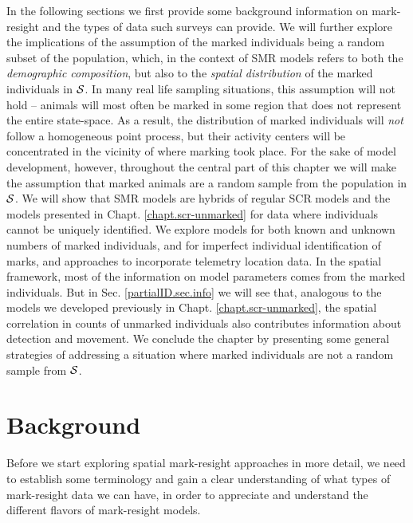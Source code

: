 In the following sections we first provide some background
information on mark-resight and the types of data such surveys can
provide. We will further explore the implications of the assumption of
the marked individuals being a random subset of the population, which,
in the context of SMR models refers to both the \emph{demographic
  composition}, but also to the \emph{spatial distribution} of the
marked individuals in ${\cal S}$. 
In many real life sampling situations, this assumption will not hold
-- animals will most often be marked in some region that does not
represent the entire state-space. As a result, the distribution of marked individuals will \emph{not} follow a homogeneous point process, but their activity centers will be concentrated in the vicinity of where marking took place. 
For the sake of model development, however, throughout the central part of this chapter we will make the assumption that marked animals are a random sample from the population in ${\cal S}$. We will show that SMR models are hybrids of regular SCR models and the models
presented in Chapt. \ref{chapt.scr-unmarked} for data where
individuals cannot be uniquely identified. We explore models for both
known and unknown numbers of marked individuals, and for imperfect
individual identification of marks, and approaches to incorporate
telemetry location data. In the spatial framework, most of the
information on model parameters comes from the marked individuals. But
in Sec. \ref{partialID.sec.info} we will see that, analogous to the
models we developed previously in Chapt. \ref{chapt.scr-unmarked}, the
spatial correlation in counts of unmarked individuals also contributes
information about detection and movement. 
We conclude the chapter by presenting some general strategies of addressing a situation where marked individuals are not a random sample from ${\cal S}$. 


\section{Background}

Before we start exploring spatial mark-resight approaches in more
detail, we need to establish some terminology and gain a clear
understanding of what types of mark-resight data we can have, in order
to appreciate and understand the different flavors of mark-resight
models.

